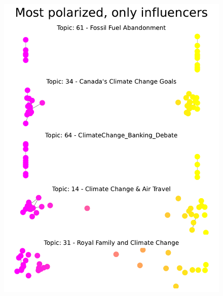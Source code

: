 \begin{figure}[H]
\begin{minipage}{0.50\textwidth}
    \end{minipage}\hfill
    \begin{minipage}{0.50\textwidth}
        \centering
         \includegraphics[width=0.98\linewidth]{Chapter5/figures/Most polarized, only influencers.pdf}
        

\end{minipage}
\end{figure}
